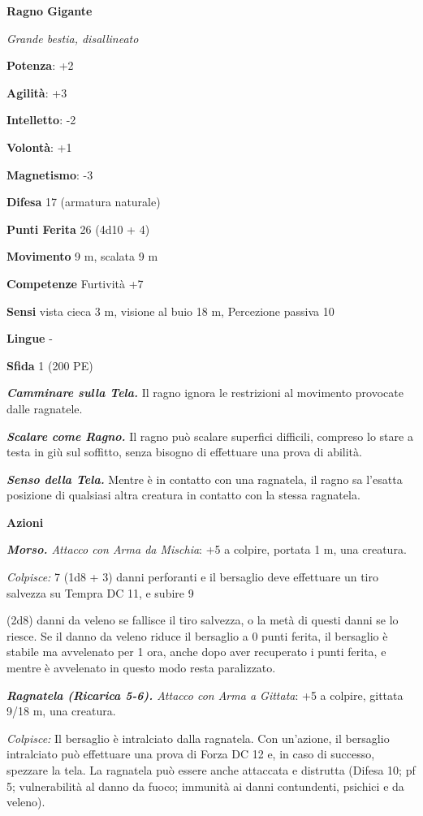 \begin{multicols}{2}
\textbf{Ragno Gigante}

\emph{Grande bestia, disallineato}

\textbf{Potenza}: +2

\textbf{Agilità}: +3

\textbf{Intelletto}: -2

\textbf{Volontà}: +1

\textbf{Magnetismo}: -3

\textbf{Difesa} 17 (armatura naturale)

\textbf{Punti Ferita} 26 (4d10 + 4)

\textbf{Movimento} 9 m, scalata 9 m

\textbf{Competenze} Furtività +7

\textbf{Sensi} vista cieca 3 m, visione al buio 18 m, Percezione passiva
10

\textbf{Lingue} -

\textbf{Sfida} 1 (200 PE)\smallskip

\emph{\textbf{Camminare sulla Tela.}} Il ragno ignora le restrizioni al
movimento provocate dalle ragnatele.

\emph{\textbf{Scalare come Ragno.}} Il ragno può scalare superfici
difficili, compreso lo stare a testa in giù sul soffitto, senza bisogno
di effettuare una prova di abilità.

\emph{\textbf{Senso della Tela.}} Mentre è in contatto con una
ragnatela, il ragno sa l'esatta posizione di qualsiasi altra creatura in
contatto con la stessa ragnatela.

\smallskip\textbf{Azioni}

\emph{\textbf{Morso.} Attacco con Arma da Mischia}: +5 a colpire,
portata 1 m, una creatura.

\emph{Colpisce:} 7 (1d8 + 3) danni perforanti e il bersaglio deve
effettuare un tiro salvezza su Tempra DC 11, e subire 9

(2d8) danni da veleno se fallisce il tiro salvezza, o la metà di questi
danni se lo riesce. Se il danno da veleno riduce il bersaglio a 0 punti
ferita, il bersaglio è stabile ma avvelenato per 1 ora, anche dopo aver
recuperato i punti ferita, e mentre è avvelenato in questo modo resta
paralizzato.

\emph{\textbf{Ragnatela (Ricarica 5-6).} Attacco con Arma a Gittata}: +5
a colpire, gittata 9/18 m, una creatura.

\emph{Colpisce:} Il bersaglio è intralciato dalla ragnatela. Con
un'azione, il bersaglio intralciato può effettuare una prova di Forza DC
12 e, in caso di successo, spezzare la tela. La ragnatela può essere
anche attaccata e distrutta (Difesa 10; pf 5; vulnerabilità al danno da
fuoco; immunità ai danni contundenti, psichici e da veleno).


\end{multicols}
